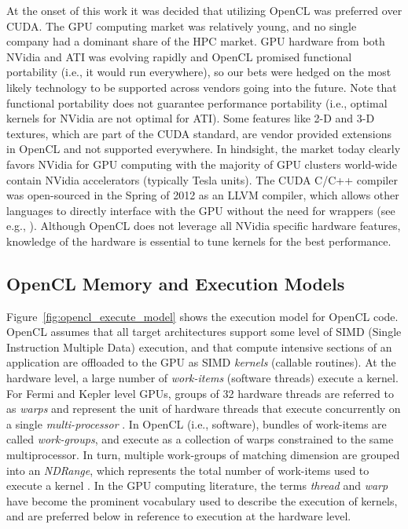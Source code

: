 \documentclass{report}
\begin{document}
At the onset of this work it was decided that utilizing OpenCL was preferred over CUDA. The GPU computing market was relatively young, and no single company had a dominant share of the HPC market. GPU hardware from both NVidia and ATI was evolving rapidly and OpenCL promised functional portability (i.e., it would run everywhere), so our bets were hedged on the most likely technology to be supported across vendors going into the future. Note that functional portability does not guarantee performance portability (i.e., optimal kernels for NVidia are not optimal for ATI). Some features like 2-D and 3-D textures, which are part of the CUDA standard, are vendor provided extensions in OpenCL and not supported everywhere. In hindsight, the market today clearly favors NVidia for GPU computing with the majority of GPU clusters world-wide contain NVidia accelerators (typically Tesla units). The CUDA C/C++ compiler was open-sourced in the Spring of 2012 as an LLVM compiler, which allows other languages to directly interface with the GPU without the need for wrappers (see e.g., \cite{NumbaPro}). Although OpenCL does not leverage all NVidia specific hardware features, knowledge of the hardware is essential to tune kernels for the best performance. 


\subsection{OpenCL Memory and Execution Models}

Figure~\ref{fig:opencl_execute_model} shows the execution model for OpenCL code. OpenCL assumes that all target architectures support some level of SIMD (Single Instruction Multiple Data) execution, and that compute intensive sections of an application are offloaded to the GPU as SIMD \emph{kernels} (callable routines). At the hardware level, a large number of \textit{work-items} (software threads) execute a kernel. For Fermi and Kepler level GPUs, groups of 32 hardware threads are referred to as \textit{warps} and represent the unit of hardware threads that execute concurrently on a single \textit{multi-processor} \cite{CudaGuide2013}. 
In OpenCL (i.e., software), bundles of work-items are called \textit{work-groups}, and execute as a collection of warps constrained to the same multiprocessor. In turn, multiple work-groups of matching dimension are grouped into an \textit{NDRange}, which represents the total number of work-items used to execute a kernel \cite{OpenCL2009}. In the GPU computing literature, the terms \textit{thread} and \textit{warp} have become the prominent vocabulary used to describe the execution of kernels, and are preferred below in reference to execution at the hardware level. 
\end{document}
